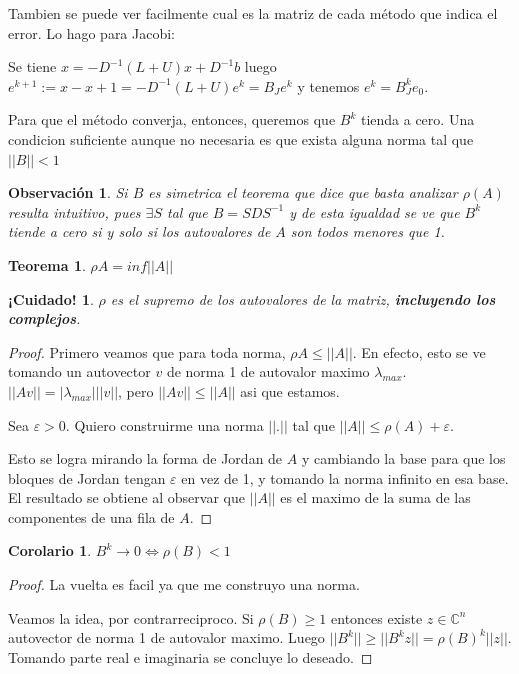 \documentclass[10pt,a4paper,final]{report}
\newtheorem{theorem}{Teorema}
\newtheorem{observation}{Observación}
\newtheorem{corollary}{Corolario}
\newtheorem{caution}{¡Cuidado!}
\begin{document}
Tambien se puede ver facilmente cual es la matriz de cada método que indica el error. Lo hago para Jacobi:

Se tiene $x=-D^{-1}(L+U)x + D^{-1} b$ luego $e^{k+1} :=x-x+1 = -D^{-1}(L+U) e^k = B_J e^k$ y tenemos $e^k = B_J^k e_0$.

Para que el método converja, entonces, queremos que $B^k$ tienda a cero. Una condicion suficiente aunque no necesaria es que exista alguna norma tal que $||B||<1$


\begin{observation}
    Si $B$ es simetrica el teorema que dice que basta analizar $\rho(A)$ resulta intuitivo, pues $\exists S$ tal que $B=SDS^{-1}$ y de esta igualdad se ve que $B^k$ tiende a cero si y solo si los autovalores de $A$ son todos menores que 1.    
\end{observation}




\begin{theorem}
    $\rho{A} = inf ||A||$
\end{theorem}

\begin{caution}
	$\rho$ es el supremo de los autovalores de la matriz, \textbf{incluyendo los complejos}.
\end{caution}

\begin{proof}
    Primero veamos que para toda norma, $\rho{A} \leq ||A||$. En efecto, esto se ve tomando un autovector $v$ de norma 1 de autovalor maximo $\lambda_{max}$. $|| A v || = |\lambda_{max}| ||v||$, pero $|| A v ||\leq ||A||$ asi que estamos.
    
    
    Sea $\varepsilon > 0$. Quiero construirme una norma $||.||$ tal que $||A|| \leq \rho(A) + \varepsilon$.
    
    Esto se logra mirando la forma de Jordan de $A$ y cambiando la base para que los bloques de Jordan tengan $\varepsilon$ en vez de 1, y tomando la norma infinito en esa base. El resultado se obtiene al observar que $||A||$ es el maximo de la suma de las componentes de una fila de $A$.
\end{proof}


\begin{corollary}
    $B^k \to 0 \Leftrightarrow \rho(B) < 1$
\end{corollary}

\begin{proof}
    La vuelta es facil ya que me construyo una norma.
    
    Veamos la idea, por contrarreciproco. Si $\rho(B) \geq 1$ entonces existe $z \in \mathbb{C}^n$ autovector de norma 1 de autovalor maximo. Luego $||B^k||\geq||B^k z|| = \rho(B)^k ||z||$. Tomando parte real e imaginaria se concluye lo deseado.
\end{proof}
\end{document}
